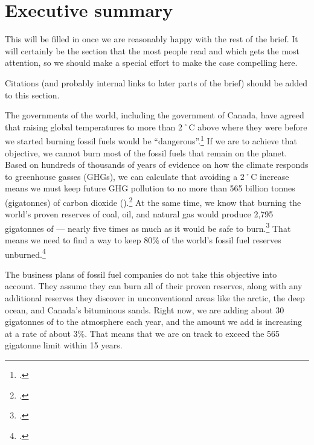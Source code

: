 
		\section{Executive summary}

\begin{vcom}
This will be filled in once we are reasonably happy with the rest of the brief. It will certainly be the section that the most people read and which gets the most attention, so we should make a special effort to make the case compelling here.
\end{vcom}


\begin{vcom}
	Citations (and probably internal links to later parts of the brief) should be added to this section.
\end{vcom}


The governments of the world, including the government of Canada, have agreed that raising global temperatures to more than 2˚C above where they were before we started burning fossil fuels would be ``dangerous''.\footcite[][]{CopenhagenAccord}
If we are to achieve that objective, we cannot burn most of the fossil fuels that remain on the planet.
Based on hundreds of thousands of years of evidence on how the climate responds to greenhouse gasses (GHGs), we can calculate that avoiding a 2˚C increase means we must keep future GHG pollution to no more than 565 billion tonnes (gigatonnes) of carbon dioxide ().\footcite[For an excellent summary that is accessible to non-experts see: ][]{TerrifyingNewMath}
At the same time, we know that burning the world's proven reserves of coal, oil, and natural gas would produce 2,795 gigatonnes of  --- nearly five times as much as it would be safe to burn.\footcite[][]{CTI2012}
That means we need to find a way to keep 80\% of the world's fossil fuel reserves unburned.\footcite[Another accessible summary of the issue can be found in: ][]{HotBackyard}



The business plans of fossil fuel companies do not take this objective into account.
They assume they can burn all of their proven reserves, along with any additional reserves they discover in unconventional areas like the arctic, the deep ocean, and Canada's bituminous sands.
Right now, we are adding about 30 gigatonnes of  to the atmosphere each year, and the amount we add is increasing at a rate of about 3\%.
That means that we are on track to exceed the 565 gigatonne limit within 15 years.



